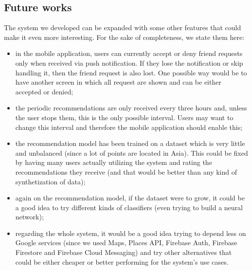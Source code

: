 \documentclass[../../main]{subfiles}
\begin{document}
\label{ss:future-works}
\subsection{Future works}

The system we developed can be expanded with some other features that could make it even more interesting. For the sake of completeness, we state them here:
\begin{itemize}
    \item in the mobile application, users can currently accept or deny friend requests only when received via push notification. 
    If they lose the notification or skip handling it, then the friend request is also lost.
    One possible way would be to have another screen in which all request are shown and can be either accepted or denied;
    \item the periodic recommendations are only received every three hours and, unless the user stops them, this is the only possible interval.
    Users may want to change this interval and therefore the mobile application should enable this;
    \item the recommendation model has been trained on a dataset which is very little and unbalanced (since a lot of points are located in Asia).
    This could be fixed by having many users actually utilizing the system and rating the recommendations they receive (and that would be better than any kind of synthetization of data);
    \item again on the recommendation model, if the dataset were to grow, it could be a good idea to try different kinds of classifiers (even trying to build a neural network);
    \item regarding the whole system, it would be a good idea trying to depend less on Google services (since we used Maps, Places API, Firebase Auth, Firebase Firestore and Firebase Cloud Messaging) and try other alternatives that could be either cheaper or better performing for the system's use cases.
\end{itemize}
\end{document}
